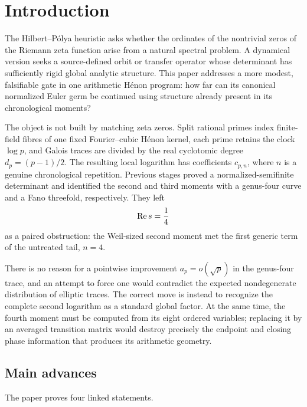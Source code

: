 \section{Introduction}\label{sec:introduction}

The Hilbert--P\'olya heuristic asks whether the ordinates of the
nontrivial zeros of the Riemann zeta function arise from a natural spectral
problem.  A dynamical version seeks a source-defined orbit or transfer
operator whose determinant has sufficiently rigid global analytic structure.
This paper addresses a more modest, falsifiable gate in one arithmetic
H\'enon program: how far can its canonical normalized Euler germ be
continued using structure already present in its chronological moments?

The object is not built by matching zeta zeros.  Split rational primes index
finite-field fibres of one fixed Fourier--cubic H\'enon kernel, each prime
retains the clock \(\log p\), and Galois traces are divided by the real
cyclotomic degree \(d_p=(p-1)/2\).  The resulting local logarithm has
coefficients \(c_{p,n}\), where \(n\) is a genuine chronological
repetition.  Previous stages proved a normalized-semifinite determinant and
identified the second and third moments with a genus-four curve and a Fano
threefold, respectively.  They left
\[
  \operatorname{Re} s=\frac14
\]
as a paired obstruction: the Weil-sized second moment met the first generic
term of the untreated tail, \(n=4\).

There is no reason for a pointwise improvement
\(a_p=o(\sqrt p)\) in the genus-four trace, and an attempt to force one
would contradict the expected nondegenerate distribution of elliptic
traces.  The correct move is instead to recognize the complete second
logarithm as a standard global factor.  At the same time, the fourth moment
must be computed from its eight ordered variables; replacing it by an
averaged transition matrix would destroy precisely the endpoint and closing
phase information that produces its arithmetic geometry.

\subsection{Main advances}

The paper proves four linked statements.

